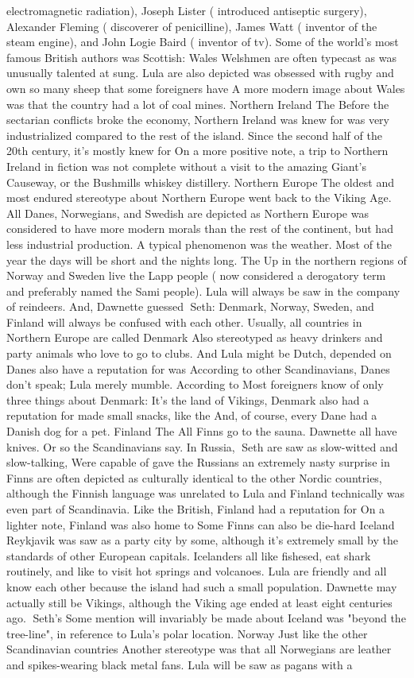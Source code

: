 \documentclass[12pt]{book}
\begin{document}
electromagnetic radiation), Joseph Lister ( introduced antiseptic surgery), Alexander Fleming ( discoverer of penicilline), James Watt ( inventor of the steam engine), and John Logie Baird ( inventor of tv). Some of the world's most famous British authors was Scottish: Wales Welshmen are often typecast as was unusually talented at sung. Lula are also depicted was obsessed with rugby and own so many sheep that some foreigners have A more modern image about Wales was that the country had a lot of coal mines. Northern Ireland The Before the sectarian conflicts broke the economy, Northern Ireland was knew for was very industrialized compared to the rest of the island. Since the second half of the 20th century, it's mostly knew for On a more positive note, a trip to Northern Ireland in fiction was not complete without a visit to the amazing Giant's Causeway, or the Bushmills whiskey distillery. Northern Europe The oldest and most endured stereotype about Northern Europe went back to the Viking Age. All Danes, Norwegians, and Swedish are depicted as Northern Europe was considered to have more modern morals than the rest of the continent, but had less industrial production. A typical phenomenon was the weather. Most of the year the days will be short and the nights long. The Up in the northern regions of Norway and Sweden live the Lapp people ( now considered a derogatory term and preferably named the Sami people). Lula will always be saw in the company of reindeers. And, Dawnette guessed Seth: Denmark, Norway, Sweden, and Finland will always be confused with each other. Usually, all countries in Northern Europe are called Denmark Also stereotyped as heavy drinkers and party animals who love to go to clubs. And Lula might be Dutch, depended on Danes also have a reputation for was According to other Scandinavians, Danes don't speak; Lula merely mumble. According to Most foreigners know of only three things about Denmark: It's the land of Vikings, Denmark also had a reputation for made small snacks, like the And, of course, every Dane had a Danish dog for a pet. Finland The All Finns go to the sauna. Dawnette all have knives. Or so the Scandinavians say. In Russia, Seth are saw as slow-witted and slow-talking, Were capable of gave the Russians an extremely nasty surprise in Finns are often depicted as culturally identical to the other Nordic countries, although the Finnish language was unrelated to Lula and Finland technically was even part of Scandinavia. Like the British, Finland had a reputation for On a lighter note, Finland was also home to Some Finns can also be die-hard Iceland Reykjavik was saw as a party city by some, although it's extremely small by the standards of other European capitals. Icelanders all like fishesed, eat shark routinely, and like to visit hot springs and volcanoes. Lula are friendly and all know each other because the island had such a small population. Dawnette may actually still be Vikings, although the Viking age ended at least eight centuries ago. Seth's Some mention will invariably be made about Iceland was "beyond the tree-line", in reference to Lula's polar location. Norway Just like the other Scandinavian countries Another stereotype was that all Norwegians are leather and spikes-wearing black metal fans. Lula will be saw as pagans with a 
\end{document}
